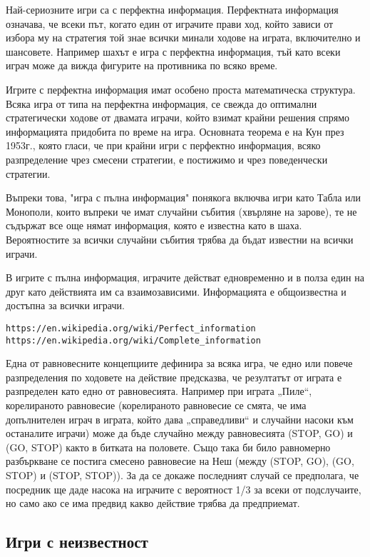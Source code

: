 Най-сериозните игри са с перфектна информация. Перфектната информация означава, че всеки път, когато един от играчите прави ход, който зависи от избора му на стратегия той знае всички минали ходове на играта, включително и шансовете. Например шахът е игра с перфектна информация, тъй като всеки играч може да вижда фигурите на противника по всяко време. 

Игрите с перфектна информация имат особено проста математическа структура. Всяка игра от типа на перфектна информация, се свежда до оптимални стратегически ходове от двамата играчи, който взимат крайни решения спрямо информацията придобита по време на игра. Основната теорема е на Кун през 1953г., която гласи, че при крайни игри с перфектно информация, всяко разпределение чрез смесени стратегии, е постижимо и чрез поведенчески стратегии.

Въпреки това, "игра с пълна информация" понякога включва игри като Табла или Монополи, които въпреки че имат случайни събития (хвърляне на зарове), те не съдържат все още нямат информация, която е известна като в шаха. Вероятностите за всички случайни събития трябва да бъдат известни на всички играчи.

В игрите с пълна информация, играчите действат едновременно и в полза един на друг като действията им са взаимозависими. Информацията е общоизвестна и достъпна за всички играчи.

\begin{lstlisting}
https://en.wikipedia.org/wiki/Perfect_information
https://en.wikipedia.org/wiki/Complete_information
\end{lstlisting}

Една от равновесните концепциите дефинира за всяка игра, че едно или повече разпределения по ходовете на действие предсказва, че резултатът от играта е разпределен като едно от равновесията. Например при играта „Пиле“, корелираното равновесие (корелираното равновесие се смята, че има допълнителен играч в играта, който дава „справедливи“ и случайни насоки към останалите играчи) може да бъде случайно между равновесията (STOP, GO) и (GO, STOP) както в битката на половете.  Също така би било равномерно разбъркване се постига смесено равновесие на Неш (между (STOP, GO), (GO, STOP) и (STOP, STOP)). За да се докаже последният случай се предполага, че посредник ще даде насока на играчите с вероятност 1/3 за всеки от подслучаите, но само ако се има предвид какво действие трябва да предприемат.

\subsection{Игри с неизвестност}

